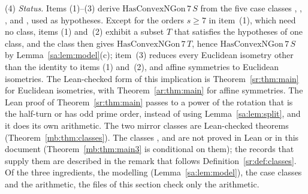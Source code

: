 \begin{remark}
(4) \emph{Status.} Items (1)--(3) derive $\mathrm{HasConvexNGon}\,7\,S$ from the five case classes ,
, ,  and , used as hypotheses. Except
for the orders $s\ge7$ in item~(1), which need no class, items (1) and~(2) exhibit a subset $T$ that satisfies the
hypotheses of one class, and the class then gives $\mathrm{HasConvexNGon}\,7\,T$, hence
$\mathrm{HasConvexNGon}\,7\,S$ by Lemma~\ref{sa:lem:model}(c); item~(3) reduces every Euclidean isometry other than
the identity to items (1) and~(2), and affine symmetries to Euclidean isometries. The Lean-checked form of this
implication is Theorem~\ref{sr:thm:main} for Euclidean isometries, with Theorem~\ref{ar:thm:main} for affine
symmetries. The Lean proof of Theorem~\ref{sr:thm:main} passes to a power of the rotation that is the half-turn or has
odd prime order, instead of using Lemma~\ref{sa:lem:split}, and it does its own arithmetic. The two mirror classes
are Lean-checked theorems (Theorem~\ref{mb:thm:classes}). The classes ,  and
 are not proved in Lean or in this document (Theorem~\ref{mb:thm:main3} is conditional on them);
the records that supply them are described in the remark that follows Definition~\ref{sr:def:classes}. Of the
three ingredients, the modelling (Lemma~\ref{sa:lem:model}), the case classes and the arithmetic, the files of this
section check only the arithmetic.


\end{remark}
